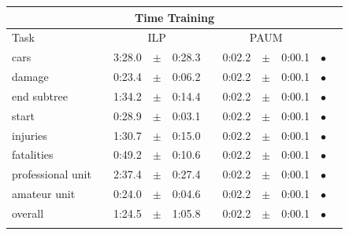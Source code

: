\begin{table}
\centering 
\begin{tabular}
{lcrclcrcl@{\hspace{0.1cm}}cc}

\multicolumn{11}{c}{Time Training}\\
\hline
Task && \multicolumn{3}{c}{ILP}  && \multicolumn{3}{c}{PAUM} && \\
\hline
              cars &&     3:28.0 &  $\pm$  &      0:28.3 & &     0:02.2 &  $\pm$  &      0:00.1 & $\bullet$ \\
            damage &&     0:23.4 &  $\pm$  &      0:06.2 & &     0:02.2 &  $\pm$  &      0:00.1 & $\bullet$ \\
       end subtree &&     1:34.2 &  $\pm$  &      0:14.4 & &     0:02.2 &  $\pm$  &      0:00.1 & $\bullet$ \\
             start &&     0:28.9 &  $\pm$  &      0:03.1 & &     0:02.2 &  $\pm$  &      0:00.1 & $\bullet$ \\
          injuries &&     1:30.7 &  $\pm$  &      0:15.0 & &     0:02.2 &  $\pm$  &      0:00.1 & $\bullet$ \\
        fatalities &&     0:49.2 &  $\pm$  &      0:10.6 & &     0:02.2 &  $\pm$  &      0:00.1 & $\bullet$ \\
  professional unit &&     2:37.4 &  $\pm$  &      0:27.4 & &     0:02.2 &  $\pm$  &      0:00.1 & $\bullet$ \\
      amateur unit &&     0:24.0 &  $\pm$  &      0:04.6 & &     0:02.2 &  $\pm$  &      0:00.1 & $\bullet$ \\
\hline
           overall &&     1:24.5 &  $\pm$  &      1:05.8 & &     0:02.2 &  $\pm$  &      0:00.1 & $\bullet$ \\
\hline
\\


\end{tabular}
\end{table}
